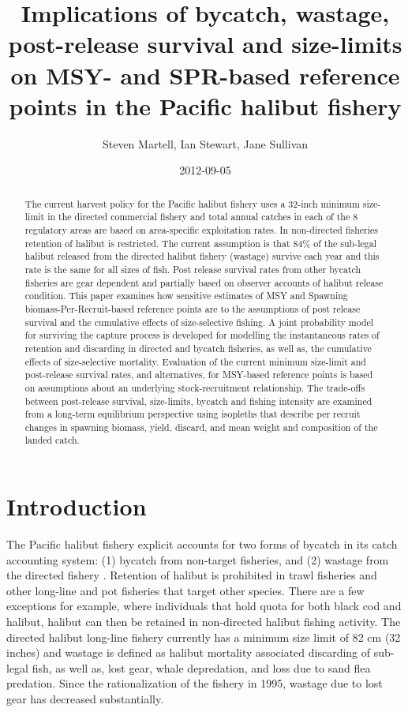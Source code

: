 \documentclass[12pt,leqno]{article}
\title{Implications of bycatch, wastage, post-release survival and size-limits on MSY- and SPR-based reference points in the Pacific halibut fishery}
\author{ Steven Martell, Ian Stewart, Jane Sullivan }
\date{2012-09-05}
\begin{document}
\ifpdf
{}
\else
{}
\fi


\maketitle

\begin{abstract}
	The current harvest policy for the Pacific halibut fishery uses a 32-inch minimum size-limit in the directed commercial fishery and total annual catches in each of the 8 regulatory areas are based on area-specific exploitation rates.  In non-directed fisheries retention of halibut is restricted. The current assumption is that 84\% of the sub-legal halibut released from the directed halibut fishery (wastage) survive each year and this rate is the same for all sizes of fish.  Post release survival rates from other bycatch fisheries are gear dependent and partially based on observer accounts of halibut release condition.  This paper examines how sensitive estimates of MSY and Spawning biomass-Per-Recruit-based reference points are to the assumptions of post release survival and the cumulative effects of size-selective fishing.  A joint probability model for surviving the capture process is developed for modelling the instantaneous rates of retention and discarding in directed and bycatch fisheries, as well as, the cumulative effects of size-selective mortality.  Evaluation of the current minimum size-limit and post-release survival rates, and alternatives, for MSY-based reference points is based on assumptions about an underlying stock-recruitment relationship.  The trade-offs between post-release survival, size-limits, bycatch and fishing intensity are examined from a long-term equilibrium perspective using isopleths that describe per recruit changes in spawning biomass, yield, discard, and mean weight and composition of the landed catch.


\end{abstract}

\section*{Introduction}
The Pacific halibut fishery explicit accounts for two forms of bycatch in its catch accounting system: (1) bycatch from non-target fisheries, and (2) wastage from the directed fishery \citep{gilroy2009wastage}.  Retention of halibut is prohibited in trawl fisheries and other long-line and pot fisheries that target other species.  There are a few exceptions for example, where individuals that hold quota for both black cod and halibut, halibut can then be retained in non-directed halibut fishing activity.  The directed halibut long-line fishery currently has a minimum size limit of 82 cm (32 inches) and wastage is defined as halibut mortality associated discarding of sub-legal fish, as well as,  lost gear, whale depredation, and loss due to sand flea predation.  Since the rationalization of the fishery in 1995, wastage due to lost gear has decreased substantially.  
\end{document}
